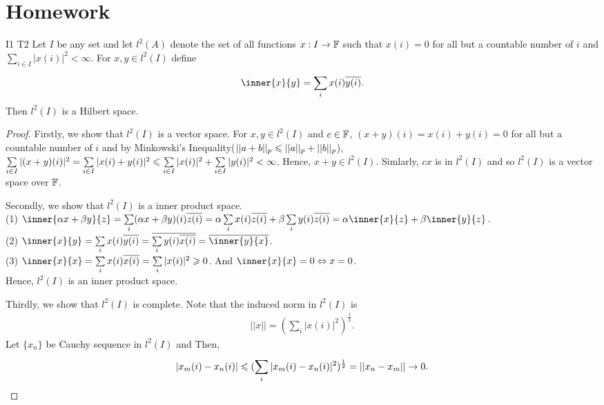 \section{Homework}
\begin{exercise}{I1 T2}{}
    Let $I$ be any set and let $l^2(A)$ denote the set of all functions $x:I\rightarrow \mathbb{F}$ such that $x(i)=0$ for all but a countable number of $i$ and 
    $\sum\limits_{i\in I}|x(i)|^2<\infty$. For $x,y\in l^2(I)$ define
    \begin{align*}
        \inner{x}{y} = \sum\limits_{i}^{}x(i)\overline{y(i)}.
    \end{align*}
    Then $l^2(I)$ is a Hilbert space.
\end{exercise}
\begin{proof}
    Firstly, we show that $l^2(I)$ is a vector space.
    For $x,y\in l^2(I)$ and $c\in \mathbb{F}$, $(x+y)(i)=x(i)+y(i)=0$ for all but a countable number of $i$ and 
    by Minkowski's Inequality($||a+b||_p\leqslant ||a||_p+||b||_p$), $\sum\limits_{i\in I}|(x+y)(i)|^2=\sum\limits_{i\in I}|x(i)+y(i)|^2\leqslant \sum\limits_{i\in I}|x(i)|^2+\sum\limits_{i\in I}|y(i)|^2<\infty$.
    Hence, $x+y\in l^2(I)$. Simlarly, $cx$ is in $l^2(I)$ and so $l^2(I)$ is a vector space over $\mathbb{F}$.
    \par
    Secondly, we show that $l^2(I)$ is a inner product space. \\
    (1) $\inner{\alpha x+\beta y}{z}=\sum\limits_{i}(\alpha x+\beta y)(i)\overline{z(i)}=\alpha\sum\limits_{i}x(i)\overline{z(i)}+\beta\sum\limits_{i}y(i)\overline{z(i)}=\alpha\inner{x}{z}+\beta\inner{y}{z}$.\\
    (2) $\inner{x}{y}=\sum\limits_{i}x(i)\overline{y(i)}=\overline{\sum\limits_{i}y(i)\overline{x(i)}}=\overline{\inner{y}{x}}$.\\
    (3) $\inner{x}{x}=\sum\limits_{i}x(i)\overline{x(i)}=\sum\limits_{i}|x(i)|^2\geqs 0$. And $\inner{x}{x}=0\Leftrightarrow x=0$.\\
    Hence, $l^2(I)$ is an inner product space.
    \par
    Thirdly, we show that $l^2(I)$ is complete.
    Note that the induced norm in $l^2(I)$ is
    \begin{align*}
        ||x|| = (\sum\limits_{i}^{}{|x(i)|}^{2})^{\frac{1}{2}}.
    \end{align*}
    Let $\{x_n\}$ be Cauchy sequence in $l^2(I)$ and 
    Then, 
    \begin{align*}
        |x_m(i)-x_n(i)|\leqs (\sum\limits_{i}^{}|x_m(i)-x_n(i)|^2)^{\frac{1}{2}}=||x_n-x_m||\rightarrow 0.

\end{align*}
\end{proof}
